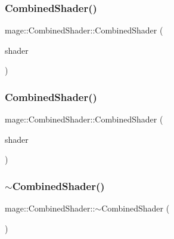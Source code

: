 \subsubsection{\texorpdfstring{Combined\+Shader()}{CombinedShader()}\hspace{0.1cm}{\footnotesize\ttfamily [2/3]}}
{\footnotesize\ttfamily mage\+::\+Combined\+Shader\+::\+Combined\+Shader (\begin{DoxyParamCaption}\item[{const \hyperlink{structmage_1_1_combined_shader}{Combined\+Shader} \&}]{shader }\end{DoxyParamCaption})\hspace{0.3cm}{\ttfamily [default]}}

\hypertarget{structmage_1_1_combined_shader_a74c1a44f6b1ec3cc1734b18b337441d3}{}\label{structmage_1_1_combined_shader_a74c1a44f6b1ec3cc1734b18b337441d3} 
\subsubsection{\texorpdfstring{Combined\+Shader()}{CombinedShader()}\hspace{0.1cm}{\footnotesize\ttfamily [3/3]}}
{\footnotesize\ttfamily mage\+::\+Combined\+Shader\+::\+Combined\+Shader (\begin{DoxyParamCaption}\item[{\hyperlink{structmage_1_1_combined_shader}{Combined\+Shader} \&\&}]{shader }\end{DoxyParamCaption})\hspace{0.3cm}{\ttfamily [default]}}

\hypertarget{structmage_1_1_combined_shader_a6b1767d2525724f2f9120df87253973e}{}\label{structmage_1_1_combined_shader_a6b1767d2525724f2f9120df87253973e} 
\subsubsection{\texorpdfstring{$\sim$\+Combined\+Shader()}{~CombinedShader()}}
{\footnotesize\ttfamily mage\+::\+Combined\+Shader\+::$\sim$\+Combined\+Shader (\begin{DoxyParamCaption}{ }\end{DoxyParamCaption})\hspace{0.3cm}{\ttfamily [default]}}



